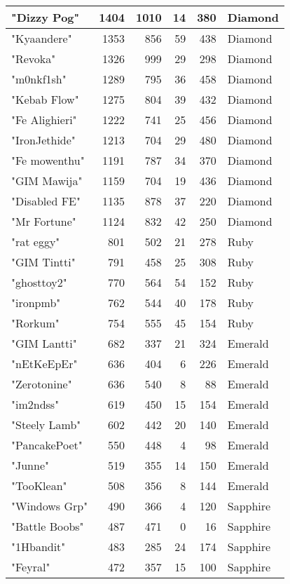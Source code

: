 \documentclass{article}
\begin{document}
\begin{table}[htbp]
\begin{tabular}{|l|r|r|r|r|l|}
"Dizzy Pog" & 1404 & 1010 & 14 & 380 & Diamond \\ \hline
"Kyaandere" & 1353 & 856 & 59 & 438 & Diamond \\ \hline
"Revoka" & 1326 & 999 & 29 & 298 & Diamond \\ \hline
"m0nkf1sh" & 1289 & 795 & 36 & 458 & Diamond \\ \hline
"Kebab Flow" & 1275 & 804 & 39 & 432 & Diamond \\ \hline
"Fe Alighieri" & 1222 & 741 & 25 & 456 & Diamond \\ \hline
"IronJethide" & 1213 & 704 & 29 & 480 & Diamond \\ \hline
"Fe mowenthu" & 1191 & 787 & 34 & 370 & Diamond \\ \hline
"GIM Mawija" & 1159 & 704 & 19 & 436 & Diamond \\ \hline
"Disabled FE" & 1135 & 878 & 37 & 220 & Diamond \\ \hline
"Mr Fortune" & 1124 & 832 & 42 & 250 & Diamond \\ \hline
"rat eggy" & 801 & 502 & 21 & 278 & Ruby \\ \hline
"GIM Tintti" & 791 & 458 & 25 & 308 & Ruby \\ \hline
"ghosttoy2" & 770 & 564 & 54 & 152 & Ruby \\ \hline
"ironpmb" & 762 & 544 & 40 & 178 & Ruby \\ \hline
"Rorkum" & 754 & 555 & 45 & 154 & Ruby \\ \hline
"GIM Lantti" & 682 & 337 & 21 & 324 & Emerald \\ \hline
"nEtKeEpEr" & 636 & 404 & 6 & 226 & Emerald \\ \hline
"Zerotonine" & 636 & 540 & 8 & 88 & Emerald \\ \hline
"im2ndss" & 619 & 450 & 15 & 154 & Emerald \\ \hline
"Steely Lamb" & 602 & 442 & 20 & 140 & Emerald \\ \hline
"PancakePoet" & 550 & 448 & 4 & 98 & Emerald \\ \hline
"Junne" & 519 & 355 & 14 & 150 & Emerald \\ \hline
"TooKlean" & 508 & 356 & 8 & 144 & Emerald \\ \hline
"Windows Grp" & 490 & 366 & 4 & 120 & Sapphire \\ \hline
"Battle Boobs" & 487 & 471 & 0 & 16 & Sapphire \\ \hline
"1Hbandit" & 483 & 285 & 24 & 174 & Sapphire \\ \hline
"Feyral" & 472 & 357 & 15 & 100 & Sapphire \\ \hline

\end{tabular}
\end{table}
\end{document}
